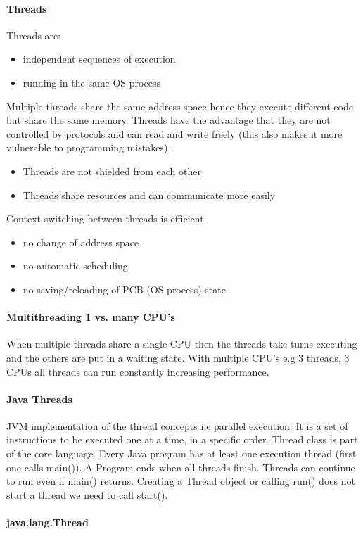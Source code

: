 \documentclass[8pt]{extreport}
\begin{document}
\paragraph{Threads}Threads are:
\begin{itemize}
\item independent sequences of execution
\item running in the same OS process
\end{itemize}
Multiple threads share the same address space hence they execute different code but share the same memory. Threads have the advantage that they are not controlled by protocols and can read and write freely (this also makes it more vulnerable to programming mistakes) . 
\begin{itemize}
\item Threads are not shielded from each other
\item Threads share resources and can communicate more easily
\end{itemize}
Context switching between threads is efficient
\begin{itemize}
\item no change of address space
\item no automatic scheduling
\item no saving/reloading of PCB (OS process) state
\end{itemize}
\paragraph{Multithreading 1 vs. many CPU's} When multiple threads share a single CPU then the threads take turns executing and the others are put in a waiting state. With multiple CPU's e.g 3 threads, 3 CPUs all threads can run constantly increasing performance.


\paragraph{Java Threads} JVM implementation of the thread concepts i.e parallel execution. It is a set of instructions to be executed one at a time, in a specific order. Thread class is part of the core language. Every Java program has at least one execution thread (first one calls main()). A Program ends when all threads finish. Threads can continue to run even if main() returns. Creating a Thread object or calling run() does not start a thread we need to call start().
\paragraph{java.lang.Thread}
\end{document}
